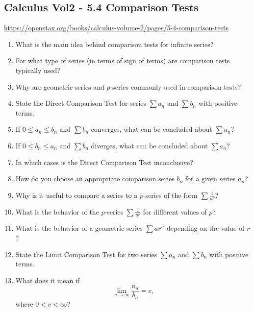 \subsection{Calculus Vol2 - 5.4 Comparison Tests}

\url{https://openstax.org/books/calculus-volume-2/pages/5-4-comparison-tests}

\begin{enumerate}

\item What is the main idea behind comparison tests for infinite series?

\item For what type of series (in terms of sign of terms) are comparison tests typically used?

\item Why are geometric series and $p$-series commonly used in comparison tests?

\item State the Direct Comparison Test for series $\sum a_n$ and $\sum b_n$ with positive terms.

\item If $0 \le a_n \le b_n$ and $\sum b_n$ converges, what can be concluded about $\sum a_n$?

\item If $0 \le b_n \le a_n$ and $\sum b_n$ diverges, what can be concluded about $\sum a_n$?

\item In which cases is the Direct Comparison Test inconclusive?

\item How do you choose an appropriate comparison series $b_n$ for a given series $a_n$?

\item Why is it useful to compare a series to a $p$-series of the form $\sum \frac{1}{n^p}$?

\item What is the behavior of the $p$-series $\sum \frac{1}{n^p}$ for different values of $p$?

\item What is the behavior of a geometric series $\sum ar^n$ depending on the value of $r$?

\item State the Limit Comparison Test for two series $\sum a_n$ and $\sum b_n$ with positive terms.

\item What does it mean if
  \[
    \lim_{n \to \infty} \frac{a_n}{b_n} = c,
  \]
  where $0 < c < \infty$?


\end{enumerate}
